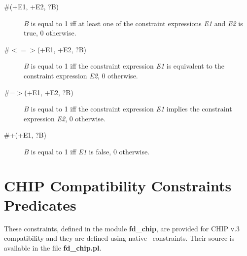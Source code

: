 \begin{description}
\item[\#\orsy(+E1, +E2, ?B)]
{\it B} is equal to 1 iff
at least one of the constraint expressions {\it E1} and {\it E2} is true,
0 otherwise.

\item[\#$<=>$(+E1, +E2, ?B)]
{\it B} is equal to 1 iff
the constraint expression {\it E1} is equivalent to the
constraint expression {\it E2},
0 otherwise.

\item[\#=$>$(+E1, +E2, ?B)]
{\it B} is equal to 1 iff
the constraint expression {\it E1} implies the
constraint expression {\it E2},
0 otherwise.

\item[\#\bsl+(+E1, ?B)]
{\it B} is equal to 1 iff
{\it E1} is false,
0 otherwise.

\end{description}

\section{CHIP Compatibility Constraints Predicates}
These constraints, defined in the module {\bf fd\_chip},
are provided for CHIP v.3 compatibility and they are defined using
native \eclipse\ constraints.
Their source is available in the file {\bf fd\_chip.pl}.

